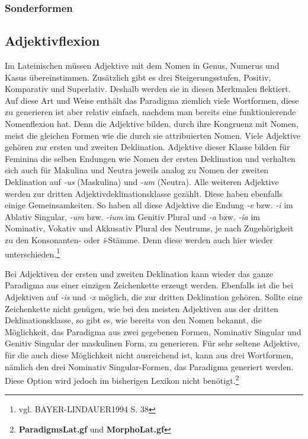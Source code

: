\documentclass[12pt,abstract=on,titlepage,bibliography=totoc,ngerman,listof=totoc]{scrreprt}
\begin{document}
\subsubsection{Sonderformen}
\subsection{Adjektivflexion}
\label{subsec:adjektiv}
Im Lateinischen müssen Adjektive mit dem Nomen in Genus, Numerus und Kasus übereinstimmen. Zusätzlich gibt es drei Steigerungsstufen, Positiv, Komparativ und Superlativ. Deshalb werden sie in diesen Merkmalen flektiert. Auf diese Art und Weise enthält das Paradigma ziemlich viele Wortformen, diese zu generieren ist aber relativ einfach, nachdem man bereits eine funktionierende Nomenflexion hat. Denn die Adjektive bilden, durch ihre Kongruenz mit Nomen, meist die gleichen Formen wie die durch sie attribuierten Nomen. Viele Adjektive gehören zur ersten und zweiten Deklination. Adjektive dieser Klasse bilden für Feminina die selben Endungen wie Nomen der ersten Deklination und verhalten sich auch für Makulina und Neutra jeweils analog zu Nomen der zweiten Deklination auf \textit{-us} (Maskulina) und \textit{-um} (Neutra). Alle weiteren Adjektive werden zur dritten Adjektivdeklinationsklasse gezählt. Diese haben ebenfalls einige Gemeinsamkeiten. So haben all diese Adjektive die Endung \textit{-e} bzw. \textit{-i} im Ablativ Singular, \textit{-um} bzw. \textit{-ium} im Genitiv Plural und \textit{-a} bzw. \textit{-ia} im Nominativ, Vokativ und Akkusativ Plural des Neutrums, je nach Zugehörigkeit zu den Konsonanten- oder \textit{ǐ}-Stämme. Denn diese werden auch hier wieder unterschieden.\footnote{vgl. BAYER-LINDAUER1994 S. 38} \par
Bei Adjektiven der ersten und zweiten Deklination kann wieder das ganze Paradigma aus einer einzigen Zeichenkette erzeugt werden. Ebenfalls ist die bei Adjektiven auf \textit{-is} und \textit{-x} möglich, die zur dritten Deklination gehören. Sollte eine Zeichenkette nicht genügen, wie bei den meisten Adjektiven aus der dritten Deklinationsklasse, so gibt es, wie bereits von den Nomen bekannt, die Möglichkeit, das Paradigma aus zwei gegebenen Formen, Nominativ Singular und Genitiv Singular der maskulinen Form, zu generieren. Für sehr seltene Adjektive, für die auch diese Möglichkeit nicht ausreichend ist, kann aus drei Wortformen, nämlich den drei Nominativ Singular-Formen, das Paradigma generiert werden. Diese Option wird jedoch im bisherigen Lexikon nicht benötigt.\footnote{\textbf{ParadigmsLat.gf} und \textbf{MorphoLat.gf}} \par
\end{document}
